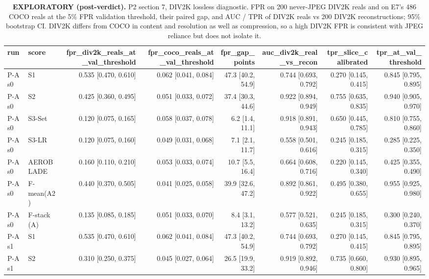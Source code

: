 \begin{table}[htbp]
\centering
\scriptsize
\caption{\textbf{EXPLORATORY (post-verdict).} P2 section 7, DIV2K lossless diagnostic. FPR on 200 never-JPEG DIV2K reals and on E7's 486 COCO reals at the 5\% FPR validation threshold, their paired gap, and AUC / TPR of DIV2K reals vs 200 DIV2K reconstructions; 95\% bootstrap CI. DIV2K differs from COCO in content and resolution as well as compression, so a high DIV2K FPR is consistent with JPEG reliance but does not isolate it.}
\label{tab:div2k-diagnostic}
\begin{tabular}{llrrrrrr}
\toprule
run & score & fpr\_div2k\_reals\_at\_val\_threshold & fpr\_coco\_reals\_at\_val\_threshold & fpr\_gap\_points & auc\_div2k\_real\_vs\_recon & tpr\_slice\_calibrated & tpr\_at\_val\_threshold \\
\midrule
P-A s0 & S1 & 0.535 [0.470, 0.610] & 0.062 [0.041, 0.084] & 47.3 [40.2, 54.9] & 0.744 [0.693, 0.792] & 0.270 [0.145, 0.415] & 0.845 [0.795, 0.895] \\
P-A s0 & S2 & 0.425 [0.360, 0.495] & 0.051 [0.033, 0.072] & 37.4 [30.3, 44.6] & 0.922 [0.894, 0.949] & 0.755 [0.635, 0.835] & 0.940 [0.905, 0.970] \\
P-A s0 & S3-Set & 0.120 [0.075, 0.165] & 0.058 [0.037, 0.078] & 6.2 [1.4, 11.1] & 0.918 [0.891, 0.943] & 0.650 [0.445, 0.785] & 0.810 [0.755, 0.860] \\
P-A s0 & S3-LR & 0.120 [0.075, 0.160] & 0.049 [0.031, 0.068] & 7.1 [2.1, 11.7] & 0.558 [0.501, 0.616] & 0.245 [0.185, 0.315] & 0.285 [0.225, 0.350] \\
P-A s0 & AEROBLADE & 0.160 [0.110, 0.210] & 0.053 [0.033, 0.074] & 10.7 [5.5, 16.4] & 0.664 [0.608, 0.716] & 0.220 [0.145, 0.340] & 0.425 [0.355, 0.490] \\
P-A s0 & F-mean(A2) & 0.440 [0.370, 0.505] & 0.041 [0.025, 0.058] & 39.9 [32.6, 47.2] & 0.892 [0.861, 0.922] & 0.495 [0.380, 0.655] & 0.955 [0.925, 0.980] \\
P-A s0 & F-stack (A) & 0.135 [0.085, 0.185] & 0.051 [0.033, 0.070] & 8.4 [3.1, 13.2] & 0.577 [0.521, 0.635] & 0.245 [0.185, 0.315] & 0.300 [0.240, 0.370] \\
P-A s1 & S1 & 0.535 [0.470, 0.610] & 0.062 [0.041, 0.084] & 47.3 [40.2, 54.9] & 0.744 [0.693, 0.792] & 0.270 [0.145, 0.415] & 0.845 [0.795, 0.895] \\
P-A s1 & S2 & 0.310 [0.250, 0.375] & 0.045 [0.027, 0.064] & 26.5 [19.9, 33.2] & 0.919 [0.892, 0.946] & 0.735 [0.660, 0.800] & 0.930 [0.895, 0.965] \\

\end{tabular}
\end{table}
